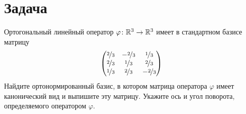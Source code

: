 \documentclass[a4paper]{article}
\theoremstyle{remark}
\begin{document}
    \section*{Задача }
        Ортогональный линейный оператор $\varphi \colon \mathbb{R}^3 \to \mathbb{R}^3$ имеет в стандартном
        базисе матрицу 
        $$
        \begin{pmatrix}
            \nicefrac23 & -\nicefrac23 & \nicefrac13 \\
            \nicefrac23 & \nicefrac13 & \nicefrac23 \\
            \nicefrac13 & \nicefrac23 & -\nicefrac23 \\
        \end{pmatrix}
        $$
        Найдите ортонормированный базис, в котором матрица оператора $\varphi$ имеет 
        канонический вид и выпишите эту матрицу. Укажите ось и угол поворота, определяемого 
        оператором $\varphi$.
\end{document}
